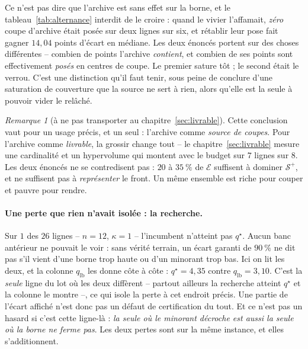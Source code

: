 \documentclass[11pt,a4paper]{article}
\theoremstyle{plain}
\theoremstyle{remark}
\newtheorem{remark}{Remarque}
\newcommand{\Ecal}{\mathcal{E}}
\newcommand{\Scal}{\mathcal{S}}
\newcommand{\qs}{q^{\star}}
\begin{document}
Ce n'est pas dire que l'archive est sans effet sur la borne, et le
tableau~\ref{tab:alternance} interdit de le croire : quand le vivier
l'affamait, \emph{zéro} coupe d'archive était posée sur deux lignes sur six,
et rétablir leur pose fait gagner $14{,}04$ points d'écart en médiane. Les
deux énoncés portent sur des choses différentes -- combien de points
l'archive \emph{contient}, et combien de ses points sont effectivement
\emph{posés} en centres de coupe. Le premier sature tôt ; le second était le
verrou. C'est une distinction qu'il faut tenir, sous peine de conclure d'une
saturation de couverture que la source ne sert à rien, alors qu'elle est la
seule à pouvoir vider le relâché.

\begin{remark}[à ne pas transporter au chapitre~\ref{sec:livrable}]
Cette conclusion vaut pour un usage précis, et un seul : l'archive comme
\emph{source de coupes}. Pour l'archive comme \emph{livrable}, la grossir
change tout -- le chapitre~\ref{sec:livrable} mesure une cardinalité et un
hypervolume qui montent avec le budget sur $7$ lignes sur $8$. Les deux
énoncés ne se contredisent pas : $20$ à $35\ \%$ de $\Ecal$ suffisent à
dominer $\Scal^{+}$, et ne suffisent pas à \emph{représenter} le front. Un
même ensemble est riche pour couper et pauvre pour rendre.
\end{remark}

\paragraph{Une perte que rien n'avait isolée : la recherche.} Sur $1$ des
$26$ lignes -- $n=12$, $\kappa=1$ -- l'incumbent n'atteint pas $\qs$. Aucun
banc antérieur ne pouvait le voir : sans vérité terrain, un écart garanti de
$90\ \%$ ne dit pas s'il vient d'une borne trop haute ou d'un minorant trop
bas. Ici on lit les deux, et la colonne $q_{\text{lb}}$ les donne côte à
côte : $\qs=4{,}35$ contre $q_{\text{lb}}=3{,}10$. C'est la \emph{seule}
ligne du lot où les deux diffèrent -- partout ailleurs la recherche atteint
$\qs$ et la colonne le montre --, ce qui isole la perte à cet endroit
précis. Une
partie de l'écart affiché n'est donc pas un défaut de certification du tout.
Et ce n'est pas un hasard si c'est cette ligne-là : \emph{la seule où le
minorant décroche est aussi la seule où la borne ne ferme pas}. Les deux
pertes sont sur la même instance, et elles s'additionnent.
\end{document}
